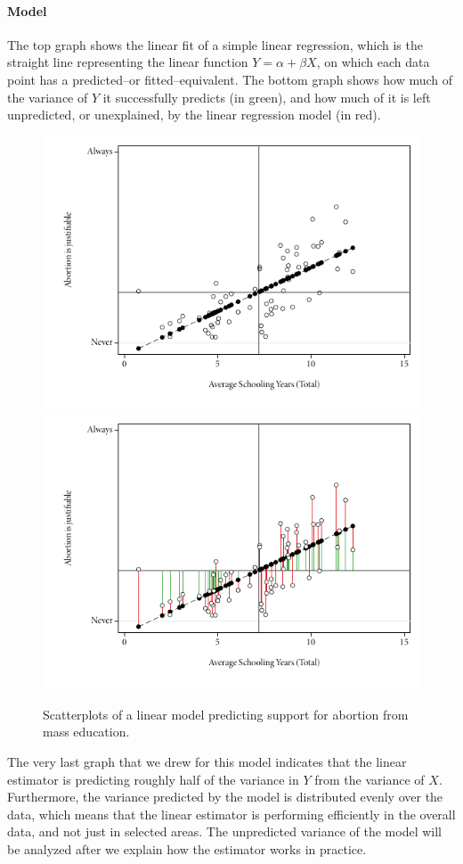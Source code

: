 \paragraph{Model} The top graph shows the linear fit of a simple linear regression, which is the straight line representing the linear function $Y = \alpha + \beta X$, on which each data point has a predicted--or fitted--equivalent. The bottom graph shows how much of the variance of $Y$ it successfully predicts (in green), and how much of it is left unpredicted, or unexplained, by the linear regression model (in red).

\begin{figure}[htp]
	\centering
	\includegraphics[width=.6\textwidth]{images/abortion_sc_lfit.pdf}\\
	\includegraphics[width=.6\textwidth]{images/abortion_sc_gfit.pdf}

	\caption[Support for abortion and mass education (2): Model]{\label{fig:model_quadrant_bottom}%
	Scatterplots of a linear model predicting support for abortion from mass education. %
	\qog}
\end{figure}%

The very last graph that we drew for this model indicates that the linear estimator is predicting roughly half of the variance in $Y$ from the variance of $X$. Furthermore, the variance predicted by the model is distributed evenly over the data, which means that the linear estimator is performing efficiently in the overall data, and not just in selected areas. The unpredicted variance of the model will be analyzed after we explain how the estimator works in practice.

